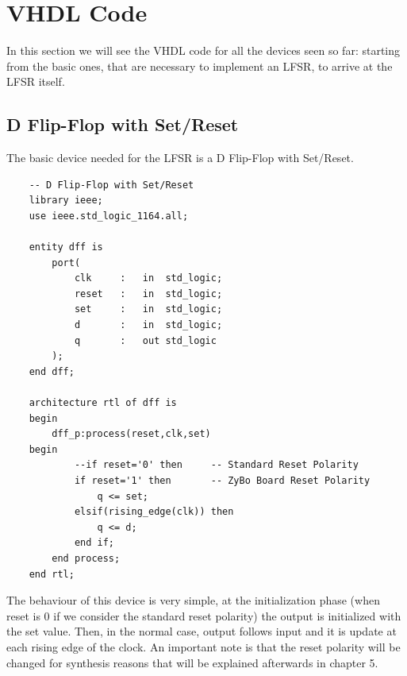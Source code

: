 \documentclass[a4paper]{report}
\begin{document}
\chapter{VHDL Code}
In this section we will see the VHDL code for all the devices seen so far: starting from the basic ones, that are necessary to implement an LFSR, to arrive at the LFSR itself.
\section{D Flip-Flop with Set/Reset}
The basic device needed for the LFSR is a D Flip-Flop with Set/Reset.
\lstset{ %
	language=VHDL}
\begin{lstlisting}
	-- D Flip-Flop with Set/Reset
	library ieee;
	use ieee.std_logic_1164.all;
	
	entity dff is
		port(
			clk		:	in 	std_logic;
			reset	:	in 	std_logic;
			set 	:	in 	std_logic;
			d 		:	in 	std_logic;
			q 		:	out std_logic
		);
	end dff;
	
	architecture rtl of dff is
	begin
		dff_p:process(reset,clk,set)
	begin
			--if reset='0' then 	-- Standard Reset Polarity 
			if reset='1' then  		-- ZyBo Board Reset Polarity
				q <= set;
			elsif(rising_edge(clk)) then
				q <= d;
			end if;
		end process;
	end rtl;
\end{lstlisting}
The behaviour of this device is very simple, at the initialization phase (when reset is 0 if we consider the standard reset polarity) the output is initialized with the set value. Then, in the normal case, output follows input and it is update at each rising edge of the clock.
An important note is that the reset polarity will be changed for synthesis reasons that will be explained afterwards in chapter 5.
\end{document}
